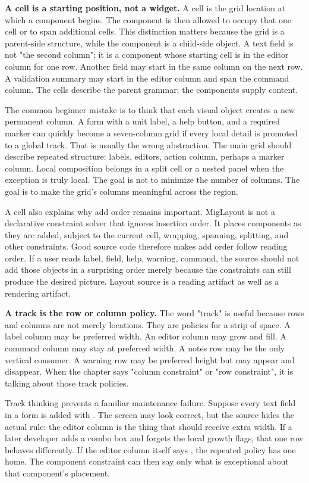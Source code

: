\textbf{A cell is a starting position, not a widget.} A cell is the grid
location at which a component begins. The component is then allowed to occupy
that one cell or to span additional cells. This distinction matters because the
grid is a parent-side structure, while the component is a child-side object. A
text field is not "the second column"; it is a component whose starting cell is
in the editor column for one row. Another field may start in the same column on
the next row. A validation summary may start in the editor column and span the
command column. The cells describe the parent grammar; the components supply
content.

The common beginner mistake is to think that each visual object creates a new
permanent column. A form with a unit label, a help button, and a required
marker can quickly become a seven-column grid if every local detail is promoted
to a global track. That is usually the wrong abstraction. The main grid should
describe repeated structure: labels, editors, action column, perhaps a marker
column. Local composition belongs in a split cell or a nested panel when the
exception is truly local. The goal is not to minimize the number of columns.
The goal is to make the grid's columns meaningful across the region.

A cell also explains why add order remains important. MigLayout is not a
declarative constraint solver that ignores insertion order. It places
components as they are added, subject to the current cell, wrapping, spanning,
splitting, and other constraints. Good source code therefore makes add order
follow reading order. If a user reads label, field, help, warning, command, the
source should not add those objects in a surprising order merely because the
constraints can still produce the desired picture. Layout source is a reading
artifact as well as a rendering artifact.

\textbf{A track is the row or column policy.} The word "track" is useful
because rows and columns are not merely locations. They are policies for a
strip of space. A label column may be preferred width. An editor column may
grow and fill. A command column may stay at preferred width. A notes row may be
the only vertical consumer. A warning row may be preferred height but may
appear and disappear. When the chapter says "column constraint" or "row
constraint", it is talking about those track policies.

Track thinking prevents a familiar maintenance failure. Suppose every text
field in a form is added with . The screen may look correct,
but the source hides the actual rule: the editor column is the thing that
should receive extra width. If a later developer adds a combo box and forgets
the local growth flags, that one row behaves differently. If the editor column
itself says , the repeated policy has one home. The component
constraint can then say only what is exceptional about that component's
placement.


